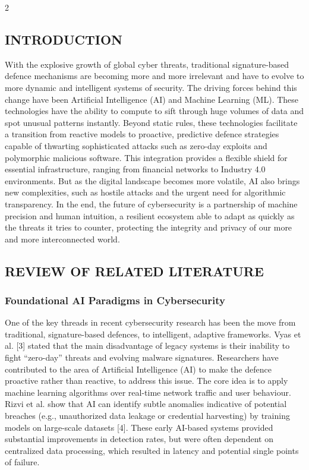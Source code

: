 \begin{multicols}{2}
  \subsection*{\centering\uppercase{INTRODUCTION}}
  With the explosive growth of global cyber threats, traditional signature-based defence mechanisms are becoming more and more irrelevant and have to evolve to more dynamic and intelligent systems of security. The driving forces behind this change have been Artificial Intelligence (AI) and Machine Learning (ML). These technologies have the ability to compute to sift through huge volumes of data and spot unusual patterns instantly. Beyond static rules, these technologies facilitate a transition from reactive models to proactive, predictive defence strategies capable of thwarting sophisticated attacks such as zero-day exploits and polymorphic malicious software. This integration provides a flexible shield for essential infrastructure, ranging from financial networks to Industry 4.0 environments. But as the digital landscape becomes more volatile, AI also brings new complexities, such as hostile attacks and the urgent need for algorithmic transparency. In the end, the future of cybersecurity is a partnership of machine precision and human intuition, a resilient ecosystem able to adapt as quickly as the threats it tries to counter, protecting the integrity and privacy of our more and more interconnected world.

  \subsection*{\centering\uppercase{REVIEW OF RELATED LITERATURE}}
  \subsubsection*{Foundational AI Paradigms in Cybersecurity}
  One of the key threads in recent cybersecurity research has been the move from traditional, signature-based defences, to intelligent, adaptive frameworks. Vyas et al. [3] stated that the main disadvantage of legacy systems is their inability to fight “zero-day” threats and evolving malware signatures. Researchers have contributed to the area of Artificial Intelligence (AI) to make the defence proactive rather than reactive, to address this issue. The core idea is to apply machine learning algorithms over real-time network traffic and user behaviour. Rizvi et al. show that AI can identify subtle anomalies indicative of potential breaches (e.g., unauthorized data leakage or credential harvesting) by training models on large-scale datasets [4]. These early AI-based systems provided substantial improvements in detection rates, but were often dependent on centralized data processing, which resulted in latency and potential single points of failure.


\end{multicols}
